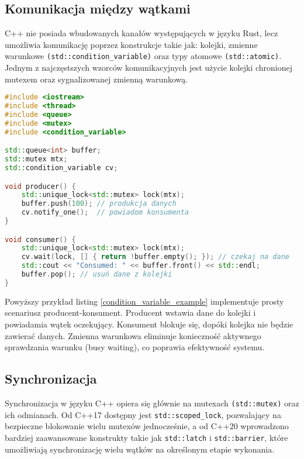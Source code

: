 \subsection{Komunikacja między wątkami}
C++ nie posiada wbudowanych kanałów  występujących w języku Rust, lecz umożliwia komunikację poprzez konstrukcje takie jak: kolejki, zmienne warunkowe \texttt{(std::condition\_variable)} oraz typy atomowe \texttt{(std::atomic)}. Jednym z najczęstszych wzorców komunikacyjnych jest użycie kolejki chronionej mutexem oraz sygnalizowanej zmienną warunkową.
\begin{lstlisting}[language=C++, caption={Przykład komunikacji między wątkami}, label={condition_variable_example}]
#include <iostream>
#include <thread>
#include <queue>
#include <mutex>
#include <condition_variable>

std::queue<int> buffer;
std::mutex mtx;
std::condition_variable cv;

void producer() {
    std::unique_lock<std::mutex> lock(mtx);
    buffer.push(100); // produkcja danych
    cv.notify_one();  // powiadom konsumenta
}

void consumer() {
    std::unique_lock<std::mutex> lock(mtx);
    cv.wait(lock, [] { return !buffer.empty(); }); // czekaj na dane
    std::cout << "Consumed: " << buffer.front() << std::endl;
    buffer.pop(); // usuń dane z kolejki
}
\end{lstlisting}
Powyższy przykład listing \ref{condition_variable_example} implementuje prosty scenariusz producent-konsument. Producent wstawia dane do kolejki i powiadamia wątek oczekujący. Konsument blokuje się, dopóki kolejka nie będzie zawierać danych. Zmienna warunkowa eliminuje konieczność aktywnego sprawdzania warunku (busy waiting), co poprawia efektywność systemu.


\subsection{Synchronizacja}
Synchronizacja w języku C++ opiera się głównie na mutexach \texttt{(std::mutex)} oraz ich odmianach. Od C++17 dostępny jest \texttt{std::scoped\_lock}, pozwalający na bezpieczne blokowanie wielu mutexów jednocześnie, a od C++20 wprowadzono bardziej zaawansowane konstrukty takie jak \texttt{std::latch} i \texttt{std::barrier}, które umożliwiają synchronizację wielu wątków na określonym etapie wykonania.

